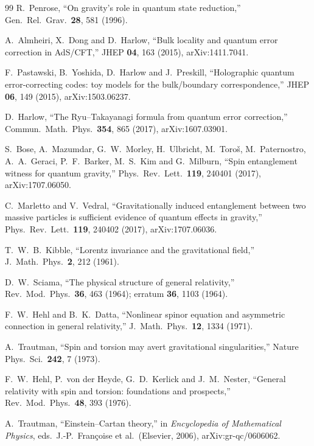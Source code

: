 \documentclass[11pt]{article}
\theoremstyle{definition}
\begin{document}
\begin{thebibliography}{99}
R.~Penrose, ``On gravity's role in quantum state reduction,''
Gen.\ Rel.\ Grav.\ \textbf{28}, 581 (1996).

A.~Almheiri, X.~Dong and D.~Harlow, ``Bulk locality and quantum error
correction in AdS/CFT,'' JHEP \textbf{04}, 163 (2015), arXiv:1411.7041.

F.~Pastawski, B.~Yoshida, D.~Harlow and J.~Preskill, ``Holographic quantum
error-correcting codes: toy models for the bulk/boundary correspondence,''
JHEP \textbf{06}, 149 (2015), arXiv:1503.06237.

D.~Harlow, ``The Ryu--Takayanagi formula from quantum error correction,''
Commun.\ Math.\ Phys.\ \textbf{354}, 865 (2017), arXiv:1607.03901.

S.~Bose, A.~Mazumdar, G.~W.~Morley, H.~Ulbricht, M.~Toro\v{s},
M.~Paternostro, A.~A.~Geraci, P.~F.~Barker, M.~S.~Kim and G.~Milburn,
``Spin entanglement witness for quantum gravity,''
Phys.\ Rev.\ Lett.\ \textbf{119}, 240401 (2017), arXiv:1707.06050.

C.~Marletto and V.~Vedral, ``Gravitationally induced entanglement between two
massive particles is sufficient evidence of quantum effects in gravity,''
Phys.\ Rev.\ Lett.\ \textbf{119}, 240402 (2017), arXiv:1707.06036.

T.~W.~B.~Kibble, ``Lorentz invariance and the gravitational field,''
J.\ Math.\ Phys.\ \textbf{2}, 212 (1961).

D.~W.~Sciama, ``The physical structure of general relativity,''
Rev.\ Mod.\ Phys.\ \textbf{36}, 463 (1964); erratum \textbf{36}, 1103
(1964).

F.~W.~Hehl and B.~K.~Datta, ``Nonlinear spinor equation and asymmetric
connection in general relativity,''
J.\ Math.\ Phys.\ \textbf{12}, 1334 (1971).

A.~Trautman, ``Spin and torsion may avert gravitational singularities,''
Nature Phys.\ Sci.\ \textbf{242}, 7 (1973).

F.~W.~Hehl, P.~von der Heyde, G.~D.~Kerlick and J.~M.~Nester, ``General
relativity with spin and torsion: foundations and prospects,''
Rev.\ Mod.\ Phys.\ \textbf{48}, 393 (1976).

A.~Trautman, ``Einstein--Cartan theory,'' in \emph{Encyclopedia of
Mathematical Physics}, eds.\ J.-P.~Fran\c{c}oise et al.\ (Elsevier, 2006),
arXiv:gr-qc/0606062.


\end{thebibliography}
\end{document}
